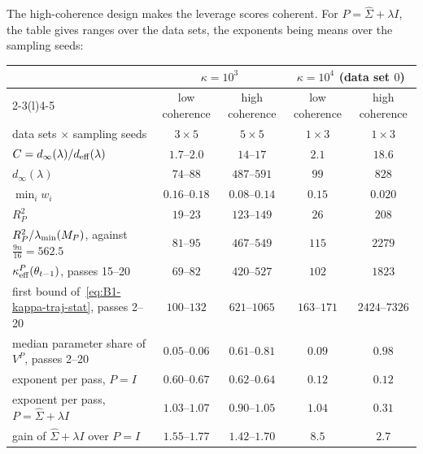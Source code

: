 The high-coherence design makes the leverage scores coherent. For $P=\hat\Sigma+\lambda I$, the table gives ranges over
the data sets, the exponents being means over the sampling seeds:
\begin{center}
\footnotesize
\setlength{\tabcolsep}{4pt}
\begin{tabular}{@{}lcccc@{}}
\toprule
 & \multicolumn{2}{c}{$\kappa=10^3$} & \multicolumn{2}{c}{$\kappa=10^4$ (data set $0$)} \\
\cmidrule(lr){2-3}\cmidrule(l){4-5}
 & low coherence & high coherence & low coherence & high coherence \\
\midrule
data sets $\times$ sampling seeds & $3\times5$ & $5\times5$ & $1\times3$ & $1\times3$ \\
$C=d_\infty(\lambda)/d_{\rm eff}(\lambda)$ & $1.7$--$2.0$ & $14$--$17$ & $2.1$ & $18.6$ \\
$d_\infty(\lambda)$ & $74$--$88$ & $487$--$591$ & $99$ & $828$ \\
$\min_iw_i$ & $0.16$--$0.18$ & $0.08$--$0.14$ & $0.15$ & $0.020$ \\
$R_P^2$ & $19$--$23$ & $123$--$149$ & $26$ & $208$ \\
$R_P^2/\lambda_{\min}(M_P)$, against $\frac{9n}{16}=562.5$ & $81$--$95$ & $467$--$549$ & $115$ & $2279$ \\
$\kappa^P_{\rm eff}(\theta_{t-1})$, passes 15--20 & $69$--$82$ & $420$--$527$ & $102$ & $1823$ \\
first bound of~\eqref{eq:B1-kappa-traj-stat}, passes 2--20 & $100$--$132$ & $621$--$1065$ & $163$--$171$ & $2424$--$7326$ \\
median parameter share of $V^P$, passes 2--20 & $0.05$--$0.06$ & $0.61$--$0.81$ & $0.09$ & $0.98$ \\
exponent per pass, $P=I$ & $0.60$--$0.67$ & $0.62$--$0.64$ & $0.12$ & $0.12$ \\
exponent per pass, $P=\hat\Sigma+\lambda I$ & $1.03$--$1.07$ & $0.90$--$1.05$ & $1.04$ & $0.31$ \\
gain of $\hat\Sigma+\lambda I$ over $P=I$ & $1.55$--$1.77$ & $1.42$--$1.70$ & $8.5$ & $2.7$ \\
\bottomrule
\end{tabular}
\end{center}
